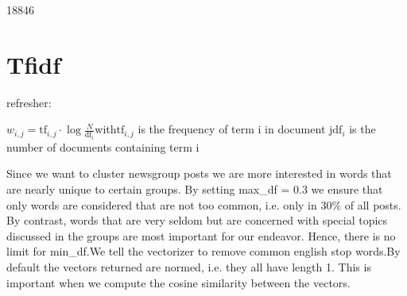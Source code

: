 \documentclass[letterpaper,10pt,english]{jupyterBook}
\begin{document}
\begin{sphinxVerbatim}[commandchars=\\\{\}]
   
   
   
   
   
   
 
    

   
   
\end{sphinxVerbatim}

\begin{sphinxVerbatim}[commandchars=\\\{\}]
18846
\end{sphinxVerbatim}


\chapter{Tf\sphinxhyphen{}idf}
\label{\detokenize{Text_Clustering:tf-idf}}
\sphinxAtStartPar
refresher:

\sphinxAtStartPar
\(w_{i,j} = \text{tf}_{i,j} \cdot \log\frac{N}{\text{df}_i}\)with\(\text{tf}_{i,j}\) is the frequency of term i in document j\(\text{df}_i\) is the number of documents containing term i

\sphinxAtStartPar
Since we want to cluster newsgroup posts we are more interested in words that are nearly unique to certain groups. By setting max\_df = 0.3 we ensure that only words are considered that are not too common, i.e. only in 30\% of all posts. By contrast, words that are very seldom but are concerned with special topics discussed in the groups are most important for our endeavor. Hence, there is no limit for min\_df.We tell the vectorizer to remove common english stop words.By default the vectors returned are normed, i.e. they all have length 1. This is important when we compute the cosine similarity between the vectors.
\end{document}
